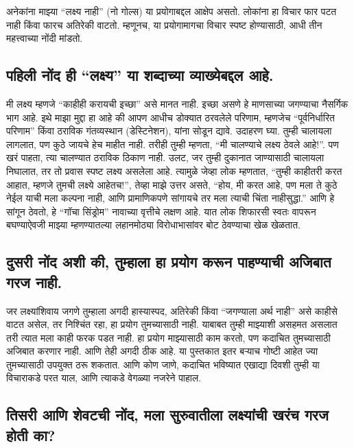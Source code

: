 अनेकांना माझ्या “लक्ष्य नाही” (नो गोल्स) या प्रयोगाबद्दल आक्षेप असतो. लोकांना हा विचार फार पटत नाही किंवा फारच अतिरेकी वाटतो. म्हणूनच, या प्रयोगामागचा विचार स्पष्ट होण्यासाठी, आधी तीन महत्त्वाच्या नोंदी मांडतो.

\subsection*{पहिली नोंद ही “लक्ष्य” या शब्दाच्या व्याख्येबद्दल आहे.}  

मी लक्ष्य म्हणजे “काहीही करायची इच्छा” असे मानत नाही. इच्छा असणे हे माणसाच्या जगण्याचा नैसर्गिक भाग आहे. इथे माझा मुद्दा हा आहे की आपण आधीच डोक्यात ठरवलेले परिणाम, म्हणजेच “पूर्वनिर्धारित परिणाम” किंवा ठराविक गंतव्यस्थान (डेस्टिनेशन), यांना सोडून द्यावे. उदाहरण घ्या. तुम्ही चालायला लागलात, पण कुठे जायचे हेच माहीत नाही. तरीही तुम्ही म्हणता, “मी चालण्याचे लक्ष्य ठेवले आहे!”. पण खरं पाहता, त्या चालण्यात ठराविक ठिकाण नाही. उलट, जर तुम्ही दुकानात जाण्यासाठी चालायला निघालात, तर तो प्रवास स्पष्ट लक्ष्य असलेला आहे. त्यामुळे जेव्हा लोक म्हणतात, “तुम्ही काहीतरी करत आहात, म्हणजे तुमची लक्ष्ये आहेतच!”, तेव्हा माझे उत्तर असते, “होय, मी करत आहे, पण मला ते कुठे नेईल याची मला कल्पना नाही, आणि प्रामाणिकपणे सांगायचे तर मला त्याची चिंता नाहीसुद्धा.” आणि हे सांगून ठेवतो,  हे “गॉचा सिंड्रोम”  नावाच्या वृत्तीचे लक्षण आहे. यात लोक शिफारसी स्वतः वापरून बघण्याऐवजी माझ्या म्हणण्यातल्या लहानमोठ्या विरोधाभासांवर बोट ठेवण्याचा खेळ खेळतात.

\subsection*{दुसरी नोंद अशी की, तुम्हाला हा प्रयोग करून पाहण्याची अजिबात गरज नाही.}

जर लक्ष्यांशिवाय जगणे तुम्हाला अगदी हास्यास्पद, अतिरेकी किंवा “जगण्याला अर्थ नाही” असे काहीसे वाटत असेल, तर निश्चिंत रहा,  हा प्रयोग तुमच्यासाठी नाही. याबाबत तुम्ही माझ्याशी असहमत असलात तरी त्यात मला काही फरक पडत नाही. हा प्रयोग माझ्यासाठी काम करतो, पण कदाचित तुमच्यासाठी अजिबात करणार नाही. आणि तेही अगदी ठीक आहे. या पुस्तकात इतर बर्‍याच गोष्टी आहेत ज्या तुमच्यासाठी उपयुक्त ठरू शकतात. आणि कोण जाणे, कदाचित भविष्यात एखाद्या दिवशी तुम्ही या विचाराकडे परत याल, आणि त्याकडे वेगळ्या नजरेने पाहाल.

\subsection*{तिसरी आणि शेवटची नोंद, मला सुरुवातीला लक्ष्यांची खरंच गरज होती का?}

